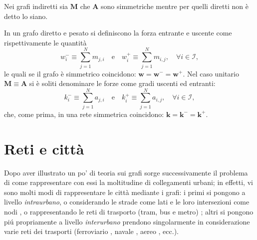     \begin{oss}
      Nei grafi indiretti sia \(\mathbf M\) che \(\mathbf A\) sono simmetriche mentre per quelli diretti non è detto lo siano.
    \end{oss}

    \begin{dfn}
      \label{defForzaGradoEntranteUscente}
      In un grafo diretto e pesato si definiscono la forza entrante e uscente come rispettivamente le quantità
      \begin{equation}
        \label{eqForzaGrafoDiretto}
        w^-_i\equiv\sum_{j=1}^Nm_{j,i}%
        \quad\text{e}\quad
        w^+_i\equiv\sum_{j=1}^Nm_{i,j},%
        \quad\forall i\in\mathcal I,
      \end{equation}
      le quali se il grafo è simmetrico coincidono: \(\mathbf w=\mathbf w^-=\mathbf w^+\). Nel caso unitario \(\mathbf M\equiv\mathbf A\) si è soliti denominare le forze come gradi uscenti ed entranti:
      \begin{equation}
        \label{eqGradoGrafoDiretto}
        k^-_i\equiv\sum_{j=1}^Na_{j,i}%
        \quad\text{e}\quad
        k^+_i\equiv\sum_{j=1}^Na_{i,j},%
        \quad\forall i\in\mathcal I,
      \end{equation}
      che, come prima, in una rete simmetrica coincidono: \(\mathbf k=\mathbf k^-=\mathbf k^+\).
    \end{dfn}

  \section{Reti e città}\label{secRetiECittà}

    Dopo aver illustrato un po' di teoria sui grafi sorge successivamente il problema di come rappresentare con essi la moltitudine di collegamenti urbani; in effetti, vi sono molti modi di rappresentare le città mediante i grafi: i primi si pongono a livello \textit{intraurbano}, o considerando le strade come lati e le loro intersezioni come nodi \cite[§ 3.1.3.1 p. 17]{Barthelemy2011}, o rappresentando le reti di trasporto (tram, bus e metro) \cite[§ 3.2.1 p. 22]{Barthelemy2011}; altri si pongono piú propriamente a livello \textit{interurbano} prendono singolarmente in considerazione varie reti dei trasporti (ferroviario \cite[§ 3.1.3.2 p. 17]{Barthelemy2011}, navale \cite[§ 3.1.4 p. 19]{Barthelemy2011}, aereo \cite[§ 3.1.2 p. 13]{Barthelemy2011}, ecc.).

